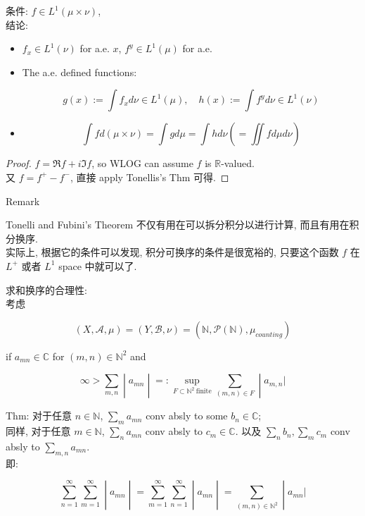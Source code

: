 \begin{theorem}{}

条件: \(f \in L^{1}(\mu \times \nu)\),\\
结论:

\begin{itemize}
\item
  \(f_{x} \in L^{1}(\nu)\) for a.e. \(x\), \(f^{y} \in L^{1}(\mu)\) for a.e.
\item
  The a.e. defined functions:

  \[g(x) := \int f_{x} d\nu \in L^{1}(\mu),\quad h(x) := \int f^{y} d\nu \in L^{1}(\nu)\]
\item
  \[\int f d(\mu \times \nu) = \int g d\mu = \int h d\nu( = \iint f d\mu d\nu)\]
\end{itemize}

\end{theorem}

\begin{proof}

\(f = \Re f + i\Im f\), so WLOG can assume \(f\) is \(\mathbb{R}\)-valued.\\
又 \(f = f^{+} - f^{-}\), 直接 apply Tonellis's Thm 可得.

\end{proof}

\begin{qlremark}{Remark}

Tonelli and Fubini's Theorem 不仅有用在可以拆分积分以进行计算, 而且有用在积分换序.\\
实际上, 根据它的条件可以发现, 积分可换序的条件是很宽裕的, 只要这个函数 \(f\) 在 \(L^{+}\) 或者 \(L^{1}\) space 中就可以了.

\end{qlremark}

\begin{example}

求和换序的合理性:\\
考虑

\[(X,\mathcal{A},\mu) = (Y,\mathcal{B},\nu) = (\mathbb{N},\mathcal{P}(\mathbb{N}),\mu_{counting})\]

if \(a_{mn} \in \mathbb{C}\) for \((m,n) \in \mathbb{N}^{2}\) and

\[\left. \infty > \sum\limits_{m,n} \middle| a_{mn} \middle| = :\sup\limits_{F \subset \mathbb{N}^{2}\ \text{finite}}\sum\limits_{(m,n) \in F} \middle| a_{m,n}| \right.\]

Thm: 对于任意 \(n \in \mathbb{N}\), \(\sum_{m}a_{mn}\) conv absly to some \(b_{n} \in \mathbb{C}\);\\
同样, 对于任意 \(m \in \mathbb{N}\), \(\sum_{n}a_{mn}\) conv absly to \(c_{m} \in \mathbb{C}\). 以及 \(\sum_{n}b_{n},\sum_{m}c_{m}\) conv absly to \(\sum_{m,n}a_{mn}\).\\
即:

\[\left. \sum\limits_{n = 1}^{\infty}\sum\limits_{m = 1}^{\infty} \middle| a_{mn} \middle| = \sum\limits_{m = 1}^{\infty}\sum\limits_{n = 1}^{\infty} \middle| a_{mn} \middle| = \sum\limits_{(m,n) \in \mathbb{N}^{2}} \middle| a_{mn}| \right.\]

\end{example}


